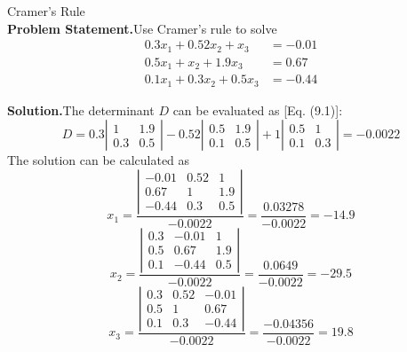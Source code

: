 \documentclass[../main.tex]{subfiles}
\begin{document}
\begin{example} Cramer's Rule\\

    \noindent\textbf{Problem Statement.}\quad Use Cramer's rule to solve\\

    $$
    \begin{aligned}
    0.3 x_{1}+0.52 x_{2}+x_{3} &=-0.01 \\
    0.5 x_{1}+x_{2}+1.9 x_{3} &=0.67 \\
    0.1 x_{1}+0.3 x_{2}+0.5 x_{3} &=-0.44
    \end{aligned}
    $$


    \noindent\textbf{Solution.}\quad The determinant $D$ can be evaluated as [Eq. (9.1)]:\\

    $$
    D=0.3\left|\begin{array}{cc}
    1 & 1.9 \\
    0.3 & 0.5
    \end{array}\right|-0.52\left|\begin{array}{cc}
    0.5 & 1.9 \\
    0.1 & 0.5
    \end{array}\right|+1\left|\begin{array}{cc}
    0.5 & 1 \\
    0.1 & 0.3
    \end{array}\right|=-0.0022
    $$
    The solution can be calculated as
    $$
    x_{1}=\frac{\left|\begin{array}{ccc}
    -0.01 & 0.52 & 1 \\
    0.67 & 1 & 1.9 \\
    -0.44 & 0.3 & 0.5
    \end{array}\right|}{-0.0022}=\frac{0.03278}{-0.0022}=-14.9
    $$
    $$
    x_{2}=\frac{\left|\begin{array}{ccc}
    0.3 & -0.01 & 1 \\
    0.5 & 0.67 & 1.9 \\
    0.1 & -0.44 & 0.5
    \end{array}\right|}{-0.0022}=\frac{0.0649}{-0.0022}=-29.5
    $$
    $$
    x_{3}=\frac{\left|\begin{array}{ccc}
    0.3 & 0.52 & -0.01 \\
    0.5 & 1 & 0.67 \\
    0.1 & 0.3 & -0.44
    \end{array}\right|}{-0.0022}=\frac{-0.04356}{-0.0022}=19.8
    $$

\end{example}
\end{document}
